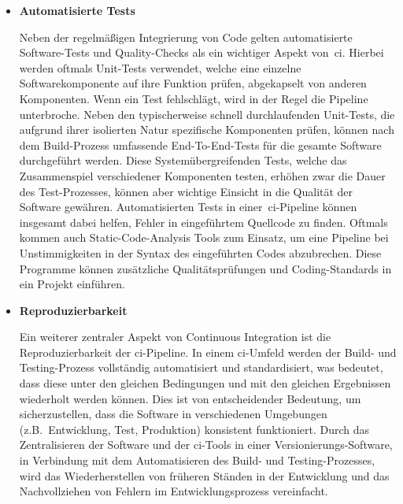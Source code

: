 \begin{itemize}
    \item {
        \textbf{Automatisierte Tests}\par
        Neben der regelmäßigen Integrierung von Code gelten automatisierte Software-Tests und Quality-Checks als ein
        wichtiger Aspekt von\ \acrshort{ci}.
        Hierbei werden oftmals Unit-Tests verwendet, welche eine einzelne Softwarekomponente auf
        ihre Funktion prüfen, abgekapselt von anderen Komponenten.
        Wenn ein Test fehlschlägt, wird in der Regel die Pipeline unterbroche.
        Neben den typischerweise schnell durchlaufenden Unit-Tests, die aufgrund ihrer isolierten Natur spezifische
        Komponenten prüfen, können nach dem Build-Prozess umfassende End-To-End-Tests für die gesamte Software
        durchgeführt werden.
        Diese Systemübergreifenden Tests, welche das Zusammenspiel verschiedener Komponenten testen, erhöhen zwar die
        Dauer des Test-Prozesses, können aber wichtige Einsicht in die Qualität der Software gewähren.
        Automatisierten Tests in einer\ \acrshort{ci}-Pipeline können insgesamt dabei helfen, Fehler in eingeführtem
        Quellcode zu finden.
        Oftmals kommen auch Static-Code-Analysis Tools zum Einsatz, um eine Pipeline bei Unstimmigkeiten in der Syntax
        des eingeführten Codes abzubrechen.
        Diese Programme können zusätzliche Qualitätsprüfungen und Coding-Standards in ein Projekt einführen.
    }

    \item {
        \textbf{Reproduzierbarkeit}\par
        Ein weiterer zentraler Aspekt von Continuous Integration ist die Reproduzierbarkeit der \acrshort{ci}-Pipeline.
        In einem \acrshort{ci}-Umfeld werden der Build- und Testing-Prozess vollständig automatisiert und
        standardisiert, was bedeutet, dass diese unter den gleichen Bedingungen und mit den gleichen Ergebnissen
        wiederholt werden können.
        Dies ist von entscheidender Bedeutung, um sicherzustellen, dass die Software in verschiedenen Umgebungen
        (z.B.\ Entwicklung, Test, Produktion) konsistent funktioniert.
        Durch das Zentralisieren der Software und der \acrshort{ci}-Tools in einer Versionierungs-Software, in
        Verbindung mit dem Automatisieren des Build- und Testing-Prozesses, wird das Wiederherstellen von früheren
        Ständen in der Entwicklung und das Nachvollziehen von Fehlern im Entwicklungsprozess vereinfacht.
    }


\end{itemize}

